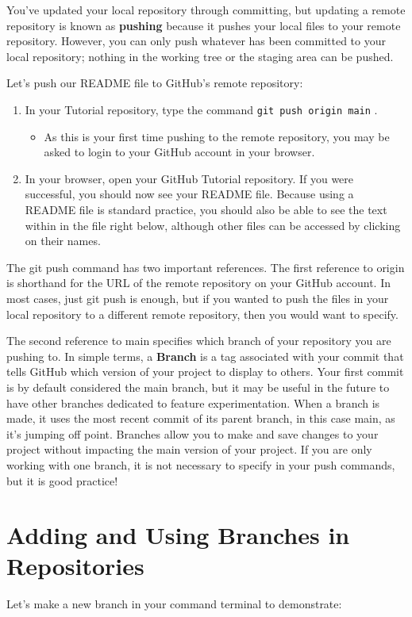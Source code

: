 \documentclass[10pt]{article}
\begin{document}
You've updated your local repository through committing, but updating a remote repository is known as \textbf{pushing} because it pushes your local files to your remote repository. However, you can only push whatever has been committed to your local repository; nothing in the working tree or the staging area can be pushed. 

Let's push our README file to GitHub's remote repository:

\begin{enumerate}
\item In your Tutorial repository, type the command \texttt{git push origin main} . 
	\begin{itemize}
	\item As this is your first time pushing to the remote repository, you may be asked to login to your GitHub account in your browser.
	\end{itemize}
\item In your browser, open your GitHub Tutorial repository. If you were successful, you should now see your README file. Because using a README file is standard practice, you should also be able to see the text within in the file right below, although other files can be accessed by clicking on their names.
\end{enumerate}

The git push command has two important references. The first reference to origin is shorthand for the URL of the remote repository on your GitHub account. In most cases, just git push is enough, but if you wanted to push the files in your local repository to a different remote repository, then you would want to specify. 

The second reference to main specifies which branch of your repository you are pushing to. In simple terms, a \textbf{Branch} is a tag associated with your commit that tells GitHub which version of your project to display to others. Your first commit is by default considered the main branch, but it may be useful in the future to have other branches dedicated to feature experimentation. When a branch is made, it uses the most recent commit of its parent branch, in this case main, as it's jumping off point. Branches allow you to make and save changes to your project without impacting the main version of your project. If you are only working with one branch, it is not necessary to specify in your push commands, but it is good practice!

\section{Adding and Using Branches in Repositories}
Let's make a new branch in your command terminal to demonstrate:
\end{document}
